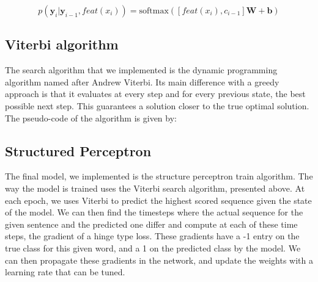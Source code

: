 \documentclass[11pt]{article}
\begin{document}
$$p(\mathbf{y}_i | \mathbf{y}_{i-1}, feat(x_i)) = \text{softmax}([feat(x_i),c_{i-1}]\mathbf{W}+\mathbf{b})$$

\subsection{Viterbi algorithm}

The search algorithm that we implemented is the dynamic programming algorithm named after Andrew Viterbi. Its main difference with a greedy approach is that it evaluates at every step and for every previous state, the best possible next step. This guarantees a solution closer to the true optimal solution. The pseudo-code of the algorithm is given by:\\

\begin{algorithmic}
    \EndIf{}
    \EndFor{}
    \EndFor{}
    \EndFor{}
    \EndProcedure{}
  \end{algorithmic}

\subsection{Structured Perceptron}

The final model, we implemented is the structure perceptron train algorithm. The way the model is trained uses the Viterbi search algorithm, presented above. At each epoch, we uses Viterbi to predict the highest scored sequence given the state of the model. We can then find the timesteps where the actual sequence for the given sentence and the predicted one differ and compute at each of these time steps, the gradient of a hinge type loss. These gradients have a -1 entry on the true class for this given word, and a 1 on the predicted class by the model. We can then propagate these gradients in the network, and update the weights with a learning rate that can be tuned.\\
\end{document}
